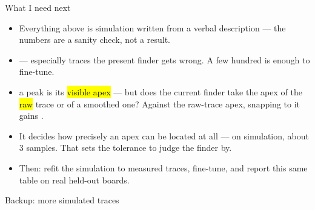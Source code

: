 \begin{frame}{What I need next}
  \begin{itemize}
    \item {} Everything above is simulation written from a
          verbal description --- the numbers are a sanity check, not a result.
    \item {} --- especially traces the present
          finder gets wrong. A few hundred is enough to fine-tune.
    \item {} a peak is its \hl{visible apex} --- but
          does the current finder take the apex of the \hl{raw} trace or of a
          smoothed one? Against the raw-trace apex, snapping to it gains
          .
    \item {} It decides how precisely an apex can be
          located at all --- on simulation, about 3 samples. That sets the
          tolerance to judge the finder by.
    \item Then: refit the simulation to measured traces, fine-tune, and report
          this same table on real held-out boards.
  \end{itemize}
\end{frame}


\begin{frame}{Backup: more simulated traces}
\end{frame}

